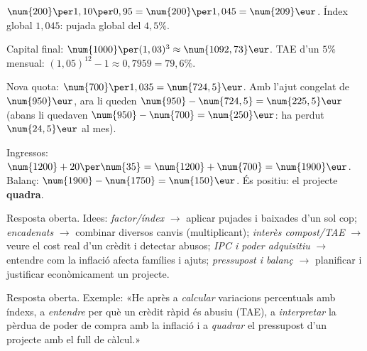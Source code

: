 \begin{solucions}
\begin{sollist}
  \item $\num{200}\per 1,10\per 0,95=\num{200}\per 1,045=\num{209}\eur$. Índex global
        $1,045$: pujada global del $4,5\%$.
  \item Capital final: $\num{1000}\per (1,03)^3\approx\num{1092,73}\eur$. TAE d'un $5\%$
        mensual: $(1,05)^{12}-1\approx 0,7959=79,6\%$.
  \item Nova quota: $\num{700}\per 1,035=\num{724,5}\eur$. Amb l'ajut congelat de
        $\num{950}\eur$, ara li queden $\num{950}-\num{724,5}=\num{225,5}\eur$ (abans li
        quedaven $\num{950}-\num{700}=\num{250}\eur$: ha perdut $\num{24,5}\eur$ al mes).
  \item Ingressos: $\num{1200}+20\per\num{35}=\num{1200}+\num{700}=\num{1900}\eur$.
        Balanç: $\num{1900}-\num{1750}=\num{150}\eur$. És positiu: el projecte
        \textbf{quadra}.
  \item Resposta oberta. Idees: \emph{factor/índex} $\rightarrow$ aplicar pujades i
        baixades d'un sol cop; \emph{encadenats} $\rightarrow$ combinar diversos canvis
        (multiplicant); \emph{interès compost/TAE} $\rightarrow$ veure el cost real d'un
        crèdit i detectar abusos; \emph{IPC i poder adquisitiu} $\rightarrow$ entendre
        com la inflació afecta famílies i ajuts; \emph{pressupost i balanç}
        $\rightarrow$ planificar i justificar econòmicament un projecte.
  \item Resposta oberta. Exemple: «He après a \emph{calcular} variacions percentuals amb
        índexs, a \emph{entendre} per què un crèdit ràpid és abusiu (TAE), a
        \emph{interpretar} la pèrdua de poder de compra amb la inflació i a
        \emph{quadrar} el pressupost d'un projecte amb el full de càlcul.»
\end{sollist}
\end{solucions}
